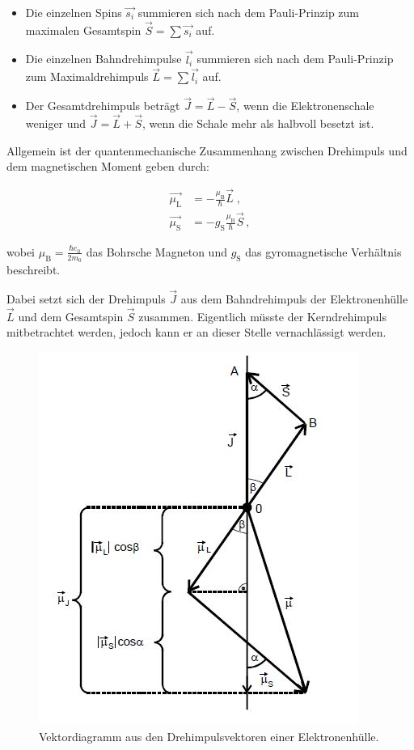 \begin{itemize}
    \item Die einzelnen Spins $\vec{s_i}$ summieren sich nach dem Pauli-Prinzip zum maximalen Gesamtspin
    $\vec{S} = \sum \vec{s_i}$ auf.
    \item Die einzelnen Bahndrehimpulse $\vec{l_i}$ summieren sich nach dem Pauli-Prinzip zum Maximaldrehimpuls 
    $\vec{L} = \sum \vec{l_i}$ auf.
    \item Der Gesamtdrehimpuls beträgt $\vec{J} = \vec{L} - \vec{S}$, wenn die Elektronenschale weniger und
    $\vec{J} = \vec{L} + \vec{S}$, wenn die Schale mehr als halbvoll besetzt ist.
\end{itemize}

\noindent
Allgemein ist der quantenmechanische Zusammenhang zwischen Drehimpuls und dem magnetischen Moment geben durch:

\begin{align}
        \vec{\mu_\text{L}} &= - \frac{\mu_\text{B}}{\hbar} \vec{L} \; , \\
        \vec{\mu_\text{S}} &= - g_\text{S} \frac{\mu_\text{B}}{\hbar} \vec{S} \, ,
\end{align}

\noindent
wobei $\mu_\text{B}=\frac{\hbar e_0}{2m_0} $ das Bohrsche Magneton und $g_\text{S}$ das gyromagnetische Verhältnis beschreibt.

\noindent
Dabei setzt sich der Drehimpuls $\vec{J}$ aus dem Bahndrehimpuls der Elektronenhülle $\vec{L}$ und dem Gesamtspin $\vec{S}$ zusammen. Eigentlich müsste der Kerndrehimpuls mitbetrachtet
werden, jedoch kann er an dieser Stelle vernachlässigt werden.

\begin{figure} [H]
        \centering
        \includegraphics[scale=0.75]{Bilder/Vek.JPG}
        \caption{Vektordiagramm aus den Drehimpulsvektoren einer Elektronenhülle. \cite{V606}}
        \label{fig:plot3}
\end{figure}

